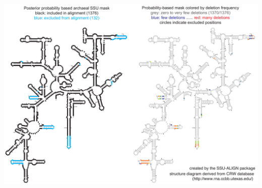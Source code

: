 \documentclass[landscape]{slides}
\begin{document}
\begin{slide}
\begin{center}
\includegraphics[width=10.5in]{figs/archaea-mask-pp-and-deletes}
\end{center}
\vfill
\end{slide}
\end{document}
